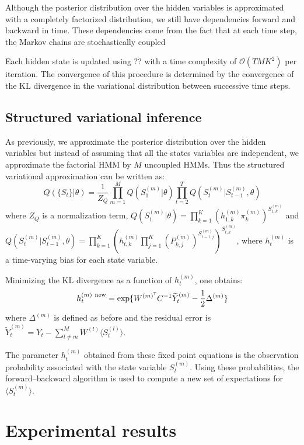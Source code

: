 \documentclass{article}
\begin{document}
Although the posterior distribution over the hidden variables is approximated with a completely factorized distribution, we still have dependencies forward and backward in time. These dependencies come from the fact that at each time step, the Markov chains are stochastically coupled

Each hidden state is updated using ?? with a time complexity of $\mathcal{O}(T M K^2)$ per iteration. The convergence of this procedure is determined by the convergence of the KL divergence in the variational distribution between successive time steps.

\subsection{Structured variational inference}

As previously, we approximate the posterior distribution over the hidden variables but instead of assuming that all the states variables are independent, we approximate the factorial HMM by $M$ uncoupled HMMs. Thus the structured variational approximation can be written as:
\[ Q(\{ S_t \}| \theta) = \frac{1}{Z_Q} \prod_{m=1}^M Q( S_1^{(m)} | \theta) \prod_{t=2}^T Q(S_t^{(m)} | S_{t-1}^{(m)}, \theta) \]
where $Z_Q$ is a normalization term, $Q( S_1^{(m)} | \theta)= \prod_{k=1}^K \left( h_{1,k}^{(m)} \pi_k^{(m)} \right)^{S_{1,k}^{(m)}}$ and $Q(S_t^{(m)} | S_{t-1}^{(m)}, \theta)= \prod_{k=1}^K \left( h_{t,k}^{(m)} \prod_{j=1}^K (P_{k,j}^{(m)})^{S_{t-1,j}^{(m)}} \right)^{S_{t,k}^{(m)}}$, where $h_t^{(m)}$ is a time-varying bias for each state variable.

Minimizing the KL divergence as a function of $h_t^{(m)}$, one obtains:
\begin{equation}
h_t^{(m) \ \textnormal{new}} = \exp\{ W^{(m)^\mathsf{T}} C^{-1} \widetilde{Y}_t^{(m)} - \frac{1}{2} \Delta^{(m)} \}
\end{equation}
where $\Delta^{(m)}$ is defined as before and the residual error is $\widetilde{Y}_t^{(m)} = Y_t - \sum_{l \ne m}^M W^{(l)} \langle S_t^{(l)} \rangle$.

The parameter $h_t^{(m)}$ obtained from these fixed point equations is the observation probability associated with the state variable $S_t^{(m)}$. Using these probabilities, the forward–backward algorithm is used to compute a new set of expectations for $\langle S_t^{(m)} \rangle$.

\section{Experimental results}
\end{document}
